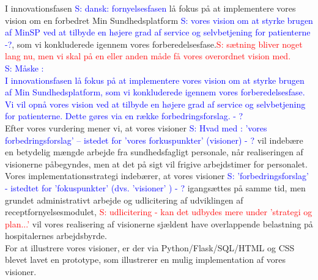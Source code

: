 I innovationsfasen 
\textcolor{blue}{S: dansk: fornyelsesfasen} lå fokus på at implementere  
vores vision om en forbedret Min Sundhedsplatform
\textcolor{blue}{S: vores vision om at styrke brugen af MinSP ved at tilbyde en højere grad af service og selvbetjening for patienterne -?}, som vi konkluderede igennem vores forberedelsesfase.\textcolor{red}{S: sætning bliver noget lang nu, men vi skal på en eller anden måde få vores overordnet vision med.\\ }
\textcolor{blue}{S: Måske : \\
I innovationsfasen lå fokus på at implementere vores vision om at styrke brugen af Min Sundhedsplatform, som vi konkluderede igennem vores forberedelsesfase. Vi vil opnå vores vision ved at tilbyde en højere grad af service og selvbetjening for patienterne. Dette gøres via en række forbedringsforslag.  - ?  }\\
Efter vores vurdering mener vi, at vores visioner 
\textcolor{blue}{S: Hvad med  : 'vores forbedringsforslag' -- istedet for 'vores forkuspunkter' (visioner) - ?}
 vil indebære en betydelig mængde arbejde fra sundhedsfagligt personale, når realiseringen af visionerne påbegyndes, men at det på sigt vil frigive arbejdstimer for personalet.\\
Vores implementationsstrategi indebærer, at vores visioner 
\textcolor{blue}{S: 'forbedringsforslag' - istedtet for 'fokuspunkter' (dvs. 'visioner' ) - ?}
 igangsættes på samme tid, men grundet administrativt arbejde og udlicitering af udviklingen af receptfornyelsesmodulet,
 \textcolor{red}{S: udlicitering - kan det udbydes mere under 'strategi og plan...'}
 vil vores realisering af visionerne sjældent have overlappende belastning på hospitalernes arbejdsbyrde.\\
For at illustrere vores visioner, er der via Python/Flask/SQL/HTML og CSS blevet lavet en prototype, som illustrerer en mulig implementation af vores visioner.\\
